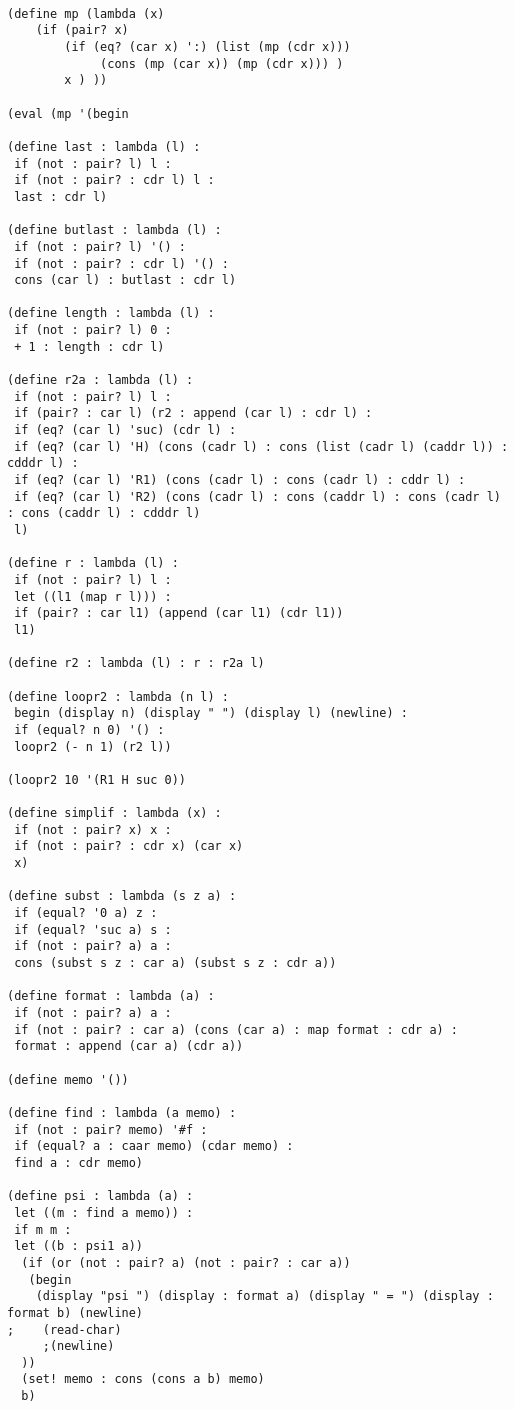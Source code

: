 \documentclass[10pt]{article}
\begin{document}
\begin{verbatim}

(define mp (lambda (x)
	(if (pair? x)
		(if (eq? (car x) ':) (list (mp (cdr x)))
			 (cons (mp (car x)) (mp (cdr x))) )
		x ) ))

(eval (mp '(begin

(define last : lambda (l) : 
 if (not : pair? l) l :
 if (not : pair? : cdr l) l :
 last : cdr l)

(define butlast : lambda (l) :
 if (not : pair? l) '() :
 if (not : pair? : cdr l) '() :
 cons (car l) : butlast : cdr l)

(define length : lambda (l) : 
 if (not : pair? l) 0 :
 + 1 : length : cdr l)

(define r2a : lambda (l) : 
 if (not : pair? l) l :
 if (pair? : car l) (r2 : append (car l) : cdr l) :
 if (eq? (car l) 'suc) (cdr l) :
 if (eq? (car l) 'H) (cons (cadr l) : cons (list (cadr l) (caddr l)) : cdddr l) :
 if (eq? (car l) 'R1) (cons (cadr l) : cons (cadr l) : cddr l) :
 if (eq? (car l) 'R2) (cons (cadr l) : cons (caddr l) : cons (cadr l) : cons (caddr l) : cdddr l) 
 l)

(define r : lambda (l) :
 if (not : pair? l) l :
 let ((l1 (map r l))) : 
 if (pair? : car l1) (append (car l1) (cdr l1)) 
 l1)

(define r2 : lambda (l) : r : r2a l)

(define loopr2 : lambda (n l) :
 begin (display n) (display " ") (display l) (newline) :
 if (equal? n 0) '() :
 loopr2 (- n 1) (r2 l))

(loopr2 10 '(R1 H suc 0))

(define simplif : lambda (x) :
 if (not : pair? x) x :
 if (not : pair? : cdr x) (car x) 
 x)
 
(define subst : lambda (s z a) :
 if (equal? '0 a) z :
 if (equal? 'suc a) s :
 if (not : pair? a) a :
 cons (subst s z : car a) (subst s z : cdr a))

(define format : lambda (a) : 
 if (not : pair? a) a : 
 if (not : pair? : car a) (cons (car a) : map format : cdr a) : 
 format : append (car a) (cdr a))

(define memo '())

(define find : lambda (a memo) :
 if (not : pair? memo) '#f :
 if (equal? a : caar memo) (cdar memo) :
 find a : cdr memo)

(define psi : lambda (a) :
 let ((m : find a memo)) :
 if m m :
 let ((b : psi1 a)) 
  (if (or (not : pair? a) (not : pair? : car a)) 
   (begin
    (display "psi ") (display : format a) (display " = ") (display : format b) (newline)
;    (read-char)
     ;(newline)
  ))
  (set! memo : cons (cons a b) memo)
  b)


\end{verbatim}
\end{document}
